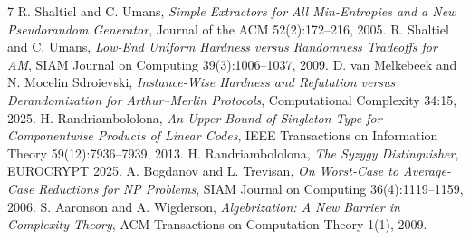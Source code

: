 \documentclass[11pt]{article}
\begin{document}
\begin{thebibliography}{7}
 R. Shaltiel and C. Umans, \emph{Simple Extractors for All Min-Entropies and a New Pseudorandom Generator}, Journal of the ACM 52(2):172--216, 2005.
 R. Shaltiel and C. Umans, \emph{Low-End Uniform Hardness versus Randomness Tradeoffs for AM}, SIAM Journal on Computing 39(3):1006--1037, 2009.
 D. van Melkebeek and N. Mocelin Sdroievski, \emph{Instance-Wise Hardness and Refutation versus Derandomization for Arthur--Merlin Protocols}, Computational Complexity 34:15, 2025.
 H. Randriambololona, \emph{An Upper Bound of Singleton Type for Componentwise Products of Linear Codes}, IEEE Transactions on Information Theory 59(12):7936--7939, 2013.
 H. Randriambololona, \emph{The Syzygy Distinguisher}, EUROCRYPT 2025.
 A. Bogdanov and L. Trevisan, \emph{On Worst-Case to Average-Case Reductions for NP Problems}, SIAM Journal on Computing 36(4):1119--1159, 2006.
 S. Aaronson and A. Wigderson, \emph{Algebrization: A New Barrier in Complexity Theory}, ACM Transactions on Computation Theory 1(1), 2009.
\end{thebibliography}
\end{document}
